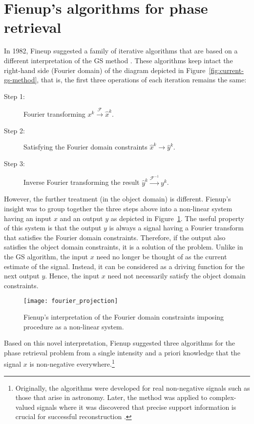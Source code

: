 \section{Fienup's algorithms for phase retrieval }
\label{sec:fienup-algor-phase}
In 1982, Fineup suggested a family of iterative algorithms that are
based on a different interpretation of the GS method
. These algorithms keep intact the right-hand side
(Fourier domain) of the diagram depicted in
Figure~\ref{fig:current-gs-method}, that is, the first three
operations of each iteration remains the same:
\begin{description}
\item[Step 1:] Fourier transforming
  $x^{k}\stackrel{\mathcal{F}}{\rightarrow}\hat{x}^{k}$.
\item[Step 2:] Satisfying the Fourier domain constraints
  $\hat{x}^{k} \rightarrow \hat{y}^{k}$.
\item[Step 3:] Inverse Fourier transforming the result $\hat{y}^{k} \stackrel{\mathcal{F}^{-1}}{\rightarrow} y^{k}$.
\end{description}
However, the further treatment (in the object domain) is
different. Fienup's insight was to group together the three steps
above into a non-linear system having an input $x$ and an output $y$
as depicted in Figure~\ref{fig:current-fienup-alg}. The useful
property of this system is that the output $y$ is always a signal
having a Fourier transform that satisfies the Fourier domain
constraints. Therefore, if the output also satisfies the object domain
constraints, it is a solution of the problem. Unlike in the GS
algorithm, the input $x$ need no longer be thought of as the
current estimate of the signal. Instead, it can be considered as a
driving function for the next output $y$. Hence, the input $x$ need
not necessarily satisfy the object domain constraints.
\begin{figure}[H]
  \centering
  \texttt{[image: fourier\_projection]}
  \caption[Projection in the Fourier domain]{Fienup's interpretation of the Fourier domain constraints
    imposing procedure as a non-linear system.}
  \label{fig:current-fienup-alg}
\end{figure}

Based on this novel interpretation, Fienup suggested three algorithms
for the phase retrieval problem from a single intensity and a priori
knowledge that the signal $x$ is non-negative
everywhere.\footnote{Originally, the algorithms were developed for
  real non-negative signals such as those that arise in
  astronomy. Later, the method was applied to complex-valued signals
  where it was discovered that precise support information is crucial
  for successful reconstruction .}


